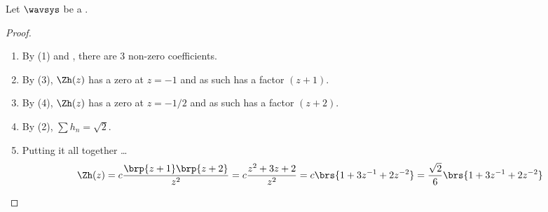 \begin{example}
\label{ex:h_1_3_2}
Let $\wavsys$ be a .
  \\\indentx{}
    \indentx{}
    \indentx{}
\end{example}
\begin{proof}
\begin{enumerate}
  \item By (1) and , there are 3 non-zero coefficients.
  \item By (3), $\Zh(z)$ has a zero at $z=-1$ and as such has a factor $(z+1)$.
  \item By (4), $\Zh(z)$ has a zero at $z=-1/2$ and as such has a factor $(z+2)$.
  \item By (2), $\sum h_n=\sqrt{2}$.
  \item Putting it all together \ldots
  \begin{align*}
    \Zh(z) &= c\frac{\brp{z+1}\brp{z+2}}{z^2}
                      = c\frac{z^2 + 3z + 2}{z^2}
                      = c\brs{1 + 3z^{-1} + 2z^{-2}}
                      = \frac{\sqrt{2}}{6}\brs{1 + 3z^{-1} + 2z^{-2}}
  \end{align*}
\end{enumerate}
\end{proof}

